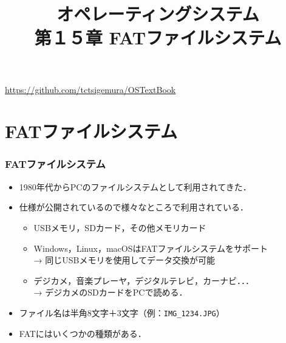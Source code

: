 \documentclass[unicode,handout]{beamer}                   %
\begin{document}
\title[FATファイルシステム]
      {オペレーティングシステム\\第１５章 FATファイルシステム}
\date{}
\begin{frame}
  \titlepage
  \centerline{\url{https://github.com/tctsigemura/OSTextBook}}
\end{frame}


\section{FATファイルシステム}
\begin{frame}
  \frametitle{FATファイルシステム}
  \begin{itemize}
  \item 1980年代からPCのファイルシステムとして利用されてきた．
  \item 仕様が公開されているので様々なところで利用されている．
    \begin{itemize}
    \item USBメモリ，SDカード，その他メモリカード
    \item Windows，Linux，macOSはFATファイルシステムをサポート \\
      → 同じUSBメモリを使用してデータ交換が可能
    \item デジカメ，音楽プレーヤ，デジタルテレビ，カーナビ．．． \\
      → デジカメのSDカードをPCで読める．
    \end{itemize}
  \item ファイル名は半角8文字＋3文字（例：\texttt{IMG\_1234.JPG}）
  \item FATにはいくつかの種類がある．
    \vfill
    \vfill
  \end{itemize}
\end{frame}
\end{document}
